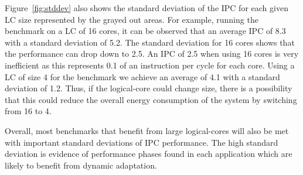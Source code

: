 Figure~\ref{fig:stddev} also shows the standard deviation of the IPC for each given LC size represented by the grayed out areas.
For example, running the  benchmark on a LC of 16 cores, it can be observed that an average IPC of 8.3 with a standard deviation of 5.2.
The standard deviation for 16 cores shows that the performance can drop down to 2.5.
An IPC of 2.5 when using 16 cores is very inefficient as this represents 0.1 of an instruction per cycle for each core.
Using a LC of size 4 for the  benchmark we achieve an average of 4.1 with a standard deviation of 1.2.
Thus, if the logical-core could change size, there is a possibility that this could reduce the overall energy consumption of the system by switching from 16 to 4.

Overall, most benchmarks that benefit from large logical-cores will also be met with important standard deviations of IPC performance.
The high standard deviation is evidence of performance phases found in each application which are likely to benefit from dynamic adaptation.


